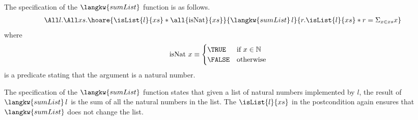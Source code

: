 The specification of the $\langkw{sumList}$ function is as follows.
\begin{align*}
\All l. \All xs.
  \hoare{ \isList {l} {xs} \ast \all {\operatorname{isNat}} {xs}}{\langkw{sumList} \, l}{r.  \isList {l} {xs} \ast r = \Sigma_{x \in xs} x}
\end{align*}
where 
\begin{align*}
\operatorname{isNat} \, x &\equiv \begin{cases} \TRUE & \text{if } x \in \mathbb{N} \\
																			\FALSE & \text{otherwise } \end{cases}
\end{align*}
is a predicate stating that the argument is a natural number.

The specification of the $\langkw{sumList}$ function states that given a list of natural numbers implemented by $l$, the result of $\langkw{sumList}\,l$ is the sum of all the natural numbers in the list.
The $\isList {l} {xs}$ in the postcondition again ensures that $\langkw{sumList}$ does not change the list.

